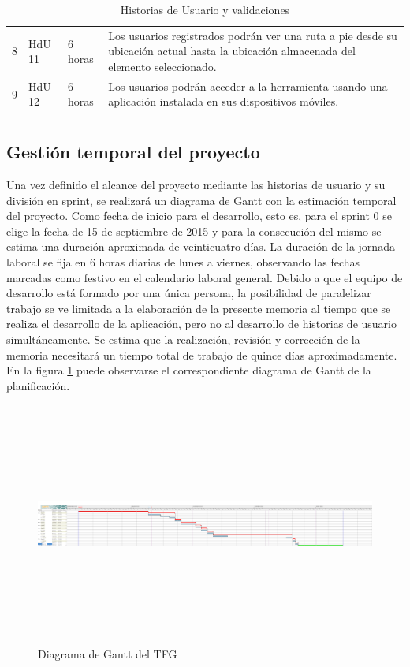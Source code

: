 \begin{longtable}{p{1cm} p{4cm} p{4cm} p{6cm}}
	8	& HdU 11	&	6 horas		&	Los usuarios registrados podrán ver una ruta a pie desde su ubicación actual hasta la ubicación 											almacenada del elemento seleccionado. \\

	\rowcolor{gray!25}
	9	& HdU 12	&	6 horas		&	Los usuarios podrán acceder a la herramienta usando una aplicación instalada en sus dispositivos móviles. \\
	\hline
	\caption{Historias de Usuario y validaciones}
	\label{tab:validaciones_HdU}
\end{longtable}

	\subsection{Gestión temporal del proyecto}
	Una vez definido el alcance del proyecto mediante las historias de usuario y su división en sprint, se realizará un diagrama de Gantt con la estimación temporal del proyecto.
	Como fecha de inicio para el desarrollo, esto es, para el sprint 0 se elige la fecha de 15 de septiembre de 2015 y para la consecución del mismo se estima una duración aproximada de veinticuatro días. La duración de la jornada laboral se fija en 6 horas diarias de lunes a viernes, observando las fechas marcadas como festivo en el calendario laboral general.
	Debido a que el equipo de desarrollo está formado por una única persona, la posibilidad de paralelizar trabajo se ve limitada a la elaboración de la presente memoria al tiempo que se realiza el desarrollo de la aplicación, pero no al desarrollo de historias de usuario simultáneamente.
	Se estima que la realización, revisión y corrección de la memoria necesitará un tiempo total de trabajo de quince días aproximadamente.
	En la figura \ref{fig:gantt} puede observarse el correspondiente diagrama de Gantt de la planificación.

\begin{figure}
	\includegraphics[height=80mm, fbox={\fboxrule} 4mm]{./images/05-resultados/01-gantt.png}
	\caption{Diagrama de Gantt del \ac{TFG}}
	\label{fig:gantt}
\end{figure}
	
